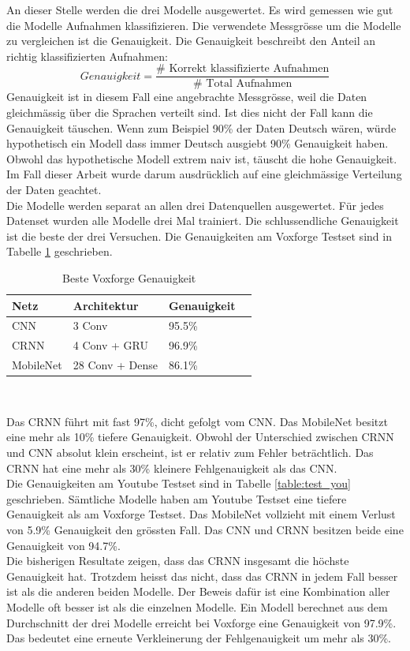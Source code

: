 An dieser Stelle werden die drei Modelle ausgewertet. Es wird gemessen wie gut die Modelle Aufnahmen klassifizieren. Die verwendete Messgrösse um die Modelle zu vergleichen ist die Genauigkeit. Die Genauigkeit beschreibt den Anteil an richtig klassifizierten Aufnahmen:
$$Genauigkeit = \frac{\# \text{ Korrekt klassifizierte Aufnahmen}}{\# \text{ Total Aufnahmen}}$$
Genauigkeit ist in diesem Fall eine angebrachte Messgrösse, weil die Daten gleichmässig über die Sprachen verteilt sind. Ist dies nicht der Fall kann die Genauigkeit täuschen. Wenn zum Beispiel 90\% der Daten Deutsch wären, würde hypothetisch ein Modell dass immer Deutsch ausgiebt 90\% Genauigkeit haben. Obwohl das hypothetische Modell extrem naiv ist, täuscht die hohe Genauigkeit. Im Fall dieser Arbeit wurde darum ausdrücklich auf eine gleichmässige Verteilung der Daten geachtet.
\\ 
Die Modelle werden separat an allen drei Datenquellen ausgewertet. Für jedes Datenset wurden alle Modelle drei Mal trainiert. Die schlussendliche Genauigkeit ist die beste der drei Versuchen. Die Genauigkeiten am Voxforge Testset sind in Tabelle \ref{table:test_vox} geschrieben.
\begin{table}[h]
	\centering
	\begin{tabular}{llll}
		\hline
		Netz & Architektur     & Genauigkeit \\ \hline
		CNN  & 3 Conv          & 95.5\%      \\
		CRNN & 4 Conv + GRU   & 96.9\%       \\
		MobileNet  & 28 Conv + Dense & 86.1\%       \\ \hline
	\end{tabular} \\
	\caption{Beste Voxforge Genauigkeit}
	\label{table:test_vox}
\end{table}
Das CRNN führt mit fast 97\%, dicht gefolgt vom CNN. Das MobileNet besitzt eine mehr als 10\% tiefere Genauigkeit. Obwohl der Unterschied zwischen CRNN und CNN absolut klein erscheint, ist er relativ zum Fehler beträchtlich. Das CRNN hat eine mehr als 30\% kleinere Fehlgenauigkeit als das CNN.
\\ 
Die Genauigkeiten am Youtube Testset sind in Tabelle \ref{table:test_you} geschrieben. Sämtliche Modelle haben am Youtube Testset eine tiefere Genauigkeit als am Voxforge Testset. Das MobileNet vollzieht mit einem Verlust von 5.9\% Genauigkeit den grössten Fall. Das CNN und CRNN besitzen beide eine Genauigkeit von 94.7\%.
\\
Die bisherigen Resultate zeigen, dass das CRNN insgesamt die höchste Genauigkeit hat. Trotzdem heisst das nicht, dass das CRNN in jedem Fall besser ist als die anderen beiden Modelle. Der Beweis dafür ist eine Kombination aller Modelle oft besser ist als die einzelnen Modelle. Ein Modell berechnet aus dem Durchschnitt der drei Modelle erreicht bei Voxforge eine Genauigkeit von 97.9\%. Das bedeutet eine erneute Verkleinerung der Fehlgenauigkeit um mehr als 30\%.
